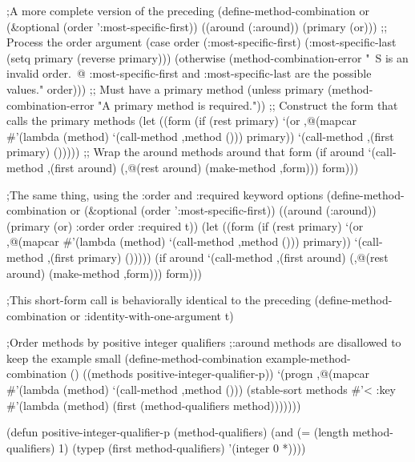 ;A more complete version of the preceding
(define-method-combination or 
        (&optional (order ':most-specific-first))
        ((around (:around))
         (primary (or)))
  ;; Process the order argument
  (case order
    (:most-specific-first)
    (:most-specific-last (setq primary (reverse primary)))
    (otherwise (method-combination-error "~S is an invalid order.~@
    :most-specific-first and :most-specific-last are the possible values."
                                         order)))
  ;; Must have a primary method
  (unless primary
    (method-combination-error "A primary method is required."))
  ;; Construct the form that calls the primary methods
  (let ((form (if (rest primary)
                  `(or ,@(mapcar #'(lambda (method)
                                     `(call-method ,method ()))
                                 primary))
                  `(call-method ,(first primary) ()))))
    ;; Wrap the around methods around that form
    (if around
        `(call-method ,(first around)
                      (,@(rest around)
                       (make-method ,form)))
        form)))

;The same thing, using the :order and :required keyword options
(define-method-combination or 
        (&optional (order ':most-specific-first))
        ((around (:around))
         (primary (or) :order order :required t))
  (let ((form (if (rest primary)
                  `(or ,@(mapcar #'(lambda (method)
                                     `(call-method ,method ()))
                                 primary))
                  `(call-method ,(first primary) ()))))
    (if around
        `(call-method ,(first around)
                      (,@(rest around)
                       (make-method ,form)))
        form)))

;This short-form call is behaviorally identical to the preceding
(define-method-combination or :identity-with-one-argument t)
 
;Order methods by positive integer qualifiers
;:around methods are disallowed to keep the example small
(define-method-combination example-method-combination ()
        ((methods positive-integer-qualifier-p))
  `(progn ,@(mapcar #'(lambda (method)
                        `(call-method ,method ()))
                    (stable-sort methods #'<
                      :key #'(lambda (method)
                               (first (method-qualifiers method)))))))

(defun positive-integer-qualifier-p (method-qualifiers)
  (and (= (length method-qualifiers) 1)
       (typep (first method-qualifiers) '(integer 0 *))))

